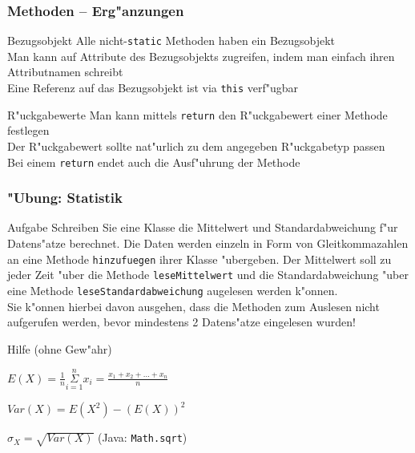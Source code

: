 \documentclass{beamer}
\begin{document}
\begin{frame}
\frametitle{Methoden -- Erg"anzungen}
\begin{block}{Bezugsobjekt}
Alle nicht-\texttt{static} Methoden haben ein Bezugsobjekt\\
Man kann auf Attribute des Bezugsobjekts zugreifen, indem man einfach ihren Attributnamen schreibt\\
Eine Referenz auf das Bezugsobjekt ist via \texttt{this} verf"ugbar
\end{block}

\begin{block}{R"uckgabewerte}
Man kann mittels \texttt{return} den R"uckgabewert einer Methode festlegen\\
Der R"uckgabewert sollte nat"urlich zu dem angegeben R"uckgabetyp passen\\
Bei einem \texttt{return} endet auch die Ausf"uhrung der Methode
\end{block}
\end{frame}


\begin{frame}
\frametitle{"Ubung: Statistik}
\begin{block}{Aufgabe}
Schreiben Sie eine Klasse die Mittelwert und Standardabweichung f"ur Datens"atze berechnet. Die Daten werden einzeln in Form von Gleitkommazahlen an eine Methode \texttt{hinzufuegen} ihrer Klasse "ubergeben. Der Mittelwert soll zu jeder Zeit "uber die Methode \texttt{leseMittelwert} und die Standardabweichung "uber eine Methode \texttt{leseStandardabweichung} augelesen werden k"onnen.\\Sie k"onnen hierbei davon ausgehen, dass die Methoden zum Auslesen nicht aufgerufen werden, bevor mindestens 2 Datens"atze eingelesen wurden!
\end{block}

\begin{block}{Hilfe (ohne Gew"ahr)}
\begin{description}[Standardabweichung]
\item[Mittelwert] $E(X) = \frac{1}{n} \underset{i = 1}{\overset{n}{\Sigma}} x_i = \frac{x_1 + x_2 + ... + x_n}{n}$
\item[Varianz] $Var(X) = E(X^2) - (E(X))^2$
\item[Standardabweichung] $\sigma_X = \sqrt{Var(X)}$ \hspace{5em} (Java: \texttt{Math.sqrt})
\end{description}
\end{block}
\end{frame}
\end{document}
